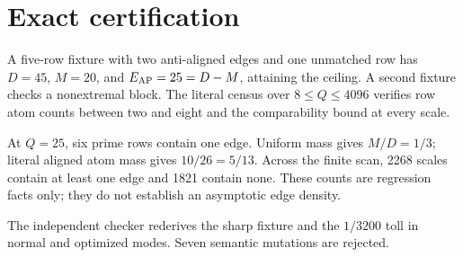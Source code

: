 \section{Exact certification}

A five-row fixture with two anti-aligned edges and one unmatched row has
$D=45$, $M=20$, and $E_{\rm AP}=25=D-M$, attaining the ceiling.  A second fixture
checks a nonextremal block.  The literal census over $8\le Q\le4096$ verifies row atom
counts between two and eight and the comparability bound at every scale.

At $Q=25$, six prime rows contain one edge.  Uniform mass gives $M/D=1/3$; literal
aligned atom mass gives $10/26=5/13$.  Across the finite scan, 2268 scales contain at
least one edge and 1821 contain none.  These counts are regression facts only; they do
not establish an asymptotic edge density.

The independent checker rederives the sharp fixture and the $1/3200$ toll in normal and
optimized modes.  Seven semantic mutations are rejected.
